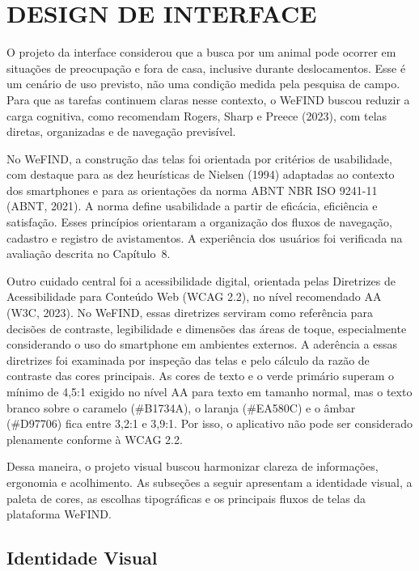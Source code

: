 \section{DESIGN DE INTERFACE}

O projeto da interface considerou que a busca por um animal pode ocorrer em situações de preocupação e fora de casa, inclusive durante deslocamentos. Esse é um cenário de uso previsto, não uma condição medida pela pesquisa de campo. Para que as tarefas continuem claras nesse contexto, o WeFIND buscou reduzir a carga cognitiva, como recomendam Rogers, Sharp e Preece (2023), com telas diretas, organizadas e de navegação previsível.

No WeFIND, a construção das telas foi orientada por critérios de usabilidade, com destaque para as dez heurísticas de Nielsen (1994) adaptadas ao contexto dos smartphones e para as orientações da norma ABNT NBR ISO 9241-11 (ABNT, 2021). A norma define usabilidade a partir de eficácia, eficiência e satisfação. Esses princípios orientaram a organização dos fluxos de navegação, cadastro e registro de avistamentos. A experiência dos usuários foi verificada na avaliação descrita no Capítulo~8.

Outro cuidado central foi a acessibilidade digital, orientada pelas Diretrizes de Acessibilidade para Conteúdo Web (WCAG 2.2), no nível recomendado AA (W3C, 2023). No WeFIND, essas diretrizes serviram como referência para decisões de contraste, legibilidade e dimensões das áreas de toque, especialmente considerando o uso do smartphone em ambientes externos. A aderência a essas diretrizes foi examinada por inspeção das telas e pelo cálculo da razão de contraste das cores principais. As cores de texto e o verde primário superam o mínimo de 4,5:1 exigido no nível AA para texto em tamanho normal, mas o texto branco sobre o caramelo (\#B1734A), o laranja (\#EA580C) e o âmbar (\#D97706) fica entre 3,2:1 e 3,9:1. Por isso, o aplicativo não pode ser considerado plenamente conforme à WCAG 2.2.

Dessa maneira, o projeto visual buscou harmonizar clareza de informações, ergonomia e acolhimento. As subseções a seguir apresentam a identidade visual, a paleta de cores, as escolhas tipográficas e os principais fluxos de telas da plataforma WeFIND.


\subsection{Identidade Visual}

